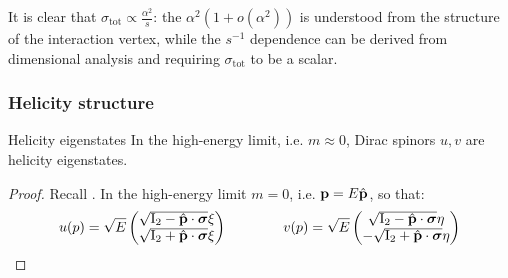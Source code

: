 It is clear that $ \sigma_\text{tot} \propto \frac{\alpha^2}{s} $: the $ \alpha^2 \left( 1 + o(\alpha^2) \right) $ is understood from the structure of the interaction vertex, while the $ s^{-1} $ dependence can be derived from dimensional analysis and requiring $ \sigma_\text{tot} $ to be a scalar.

\subsubsection{Helicity structure}

\begin{proposition}{Helicity eigenstates}{}
  In the high-energy limit, i.e. $ m \approx 0 $, Dirac spinors $ u,v $ are helicity eigenstates.
\end{proposition}

\begin{proofbox}
  \begin{proof}
    Recall . In the high-energy limit $ m = 0 $, i.e. $ \mathbf{p} = E \hat{\mathbf{p}} $, so that:
    \begin{equation*}
      u(p) = \sqrt{E}
      \begin{pmatrix}
        \sqrt{\mathrm{I}_2 - \hat{\mathbf{p}} \cdot \boldsymbol{\sigma}} \xi \\
        \sqrt{\mathrm{I}_2 + \hat{\mathbf{p}} \cdot \boldsymbol{\sigma}} \xi
      \end{pmatrix}
      \qquad \qquad
      v(p) = \sqrt{E}
      \begin{pmatrix}
        \sqrt{\mathrm{I}_2 - \hat{\mathbf{p}} \cdot \boldsymbol{\sigma}} \eta \\
        - \sqrt{\mathrm{I}_2 + \hat{\mathbf{p}} \cdot \boldsymbol{\sigma}} \eta
      \end{pmatrix}
    \end{equation*}






\end{proof}
\end{proofbox}
